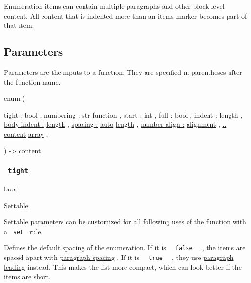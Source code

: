 Enumeration items can contain multiple paragraphs and other block-level
content. All content that is indented more than an
item\textquotesingle s marker becomes part of that item.

\subsection{\texorpdfstring{{ Parameters
}}{ Parameters }}\label{parameters}

\label{parameters-tooltip}
Parameters are the inputs to a function. They are specified in
parentheses after the function name.

{ enum } (

{ \hyperref[parameters-tight]{tight :}
\href{/docs/reference/foundations/bool/}{bool} , } {
\hyperref[parameters-numbering]{numbering :}
\href{/docs/reference/foundations/str/}{str}
\href{/docs/reference/foundations/function/}{function} , } {
\hyperref[parameters-start]{start :}
\href{/docs/reference/foundations/int/}{int} , } {
\hyperref[parameters-full]{full :}
\href{/docs/reference/foundations/bool/}{bool} , } {
\hyperref[parameters-indent]{indent :}
\href{/docs/reference/layout/length/}{length} , } {
\hyperref[parameters-body-indent]{body-indent :}
\href{/docs/reference/layout/length/}{length} , } {
\hyperref[parameters-spacing]{spacing :}
\href{/docs/reference/foundations/auto/}{auto}
\href{/docs/reference/layout/length/}{length} , } {
\hyperref[parameters-number-align]{number-align :}
\href{/docs/reference/layout/alignment/}{alignment} , } {
\hyperref[parameters-children]{..}
\href{/docs/reference/foundations/content/}{content}
\href{/docs/reference/foundations/array/}{array} , }

) -\textgreater{} \href{/docs/reference/foundations/content/}{content}

\subsubsection{\texorpdfstring{\texttt{\ tight\ }}{ tight }}\label{parameters-tight}

\href{/docs/reference/foundations/bool/}{bool}

{{ Settable }}

\label{parameters-tight-settable-tooltip}
Settable parameters can be customized for all following uses of the
function with a \texttt{\ set\ } rule.

Defines the default
\href{/docs/reference/model/enum/\#parameters-spacing}{spacing} of the
enumeration. If it is \texttt{\ }{\texttt{\ false\ }}\texttt{\ } , the
items are spaced apart with
\href{/docs/reference/model/par/\#parameters-spacing}{paragraph spacing}
. If it is \texttt{\ }{\texttt{\ true\ }}\texttt{\ } , they use
\href{/docs/reference/model/par/\#parameters-leading}{paragraph leading}
instead. This makes the list more compact, which can look better if the
items are short.


